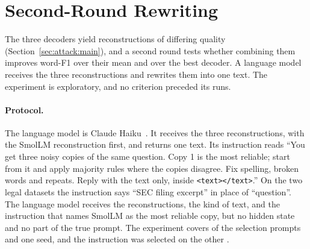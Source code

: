\section{Second-Round Rewriting}\label{sec:attack:rewriting}

The three decoders yield reconstructions of differing quality (Section~\ref{sec:attack:main}), and a second round tests whether combining them improves word-F1 over their mean and over the best decoder.
A language model receives the three reconstructions and rewrites them into one text.
The experiment is exploratory, and no criterion preceded its runs.

\paragraph{Protocol.} The language model is Claude Haiku~.
It receives the three reconstructions, with the SmolLM reconstruction first, and returns one text. %
Its instruction reads ``You get three noisy copies of the same question. Copy 1 is the most reliable; start from it and apply majority rules where the copies disagree. Fix spelling, broken words and repeats. Reply with the text only, inside \texttt{<text></text>}.''
On the two legal datasets the instruction says ``SEC filing excerpt'' in place of ``question''.
The language model receives the reconstructions, the kind of text, and the instruction that names SmolLM as the most reliable copy, but no hidden state and no part of the true prompt.
The experiment covers  of the  selection prompts and one seed, and the instruction was selected on the other . %

